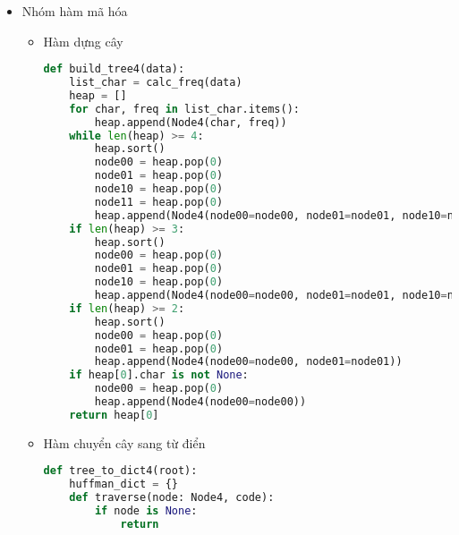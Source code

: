 \begin{itemize}
\begin{lstlisting}[language=Python]
    def to_table(self):
        node = 0
        tree = ''
        char = []
        if self.char is not None:
            return 1, tree, [self.char]
        else:
            node00, tree00, char00 = self.node00.to_table() if self.node00 is not None else (0, '', [])
            node01, tree01, char01 = self.node01.to_table() if self.node01 is not None else (0, '', [])
            node10, tree10, char10 = self.node10.to_table() if self.node10 is not None else (0, '', [])
            node11, tree11, char11 = self.node11.to_table() if self.node11 is not None else (0, '', [])
            char = char00 + char01 + char10 + char11
            node = 1 + node00 + node01 + node10 + node11
            if node00 > 0:
                tree += '00' + tree00
            if node01 > 0:
                tree += '01' + tree01
            if node10 > 0:
                tree += '10' + tree10
            if node11 > 0:
                tree += '11' + tree11
        return [node, tree, char]
    def leafs(self):
        if self.node00 is None and self.node01 is None and self.node10 is None and self.node11 is None:
            return [self]
        else:
            return (self.node00.leafs() if self.node00 is not None else []) + (self.node01.leafs() if self.node01 is not None else []) + (self.node10.leafs() if self.node10 is not None else []) + (self.node11.leafs() if self.node11 is not None else [])
\end{lstlisting}
\item Nhóm hàm mã hóa
\begin{itemize}
    \item Hàm dựng cây
\begin{lstlisting}[language=Python]
def build_tree4(data):
    list_char = calc_freq(data)
    heap = []
    for char, freq in list_char.items():
        heap.append(Node4(char, freq))
    while len(heap) >= 4:
        heap.sort()
        node00 = heap.pop(0)
        node01 = heap.pop(0)
        node10 = heap.pop(0)
        node11 = heap.pop(0)
        heap.append(Node4(node00=node00, node01=node01, node10=node10, node11=node11))
    if len(heap) >= 3:
        heap.sort()
        node00 = heap.pop(0)
        node01 = heap.pop(0)
        node10 = heap.pop(0)
        heap.append(Node4(node00=node00, node01=node01, node10=node10))
    if len(heap) >= 2:
        heap.sort()
        node00 = heap.pop(0)
        node01 = heap.pop(0)
        heap.append(Node4(node00=node00, node01=node01))
    if heap[0].char is not None:
        node00 = heap.pop(0)
        heap.append(Node4(node00=node00))
    return heap[0]
\end{lstlisting}
\item Hàm chuyển cây sang từ điển
\begin{lstlisting}[language=Python]
def tree_to_dict4(root):
    huffman_dict = {}
    def traverse(node: Node4, code):
        if node is None:
            return


\end{lstlisting}
\end{itemize}
\end{itemize}
